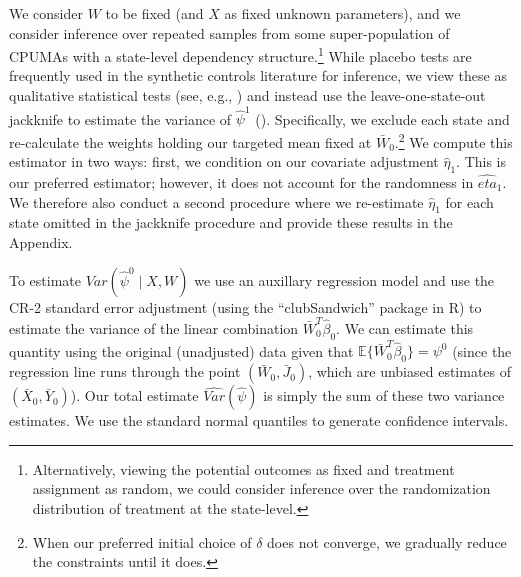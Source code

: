 We consider $W$ to be fixed (and $X$ as fixed unknown parameters), and we consider inference over repeated samples from some super-population of CPUMAs with a state-level dependency structure.\footnote{Alternatively, viewing the potential outcomes as fixed and treatment assignment as random, we could consider inference over the randomization distribution of treatment at the state-level.} While placebo tests are frequently used in the synthetic controls literature for inference, we view these as qualitative statistical tests (see, e.g., \cite{arkhangelsky2019synthetic}) and instead use the leave-one-state-out jackknife to estimate the variance of $\hat{\psi}^1$ (\cite{cameron2015practitioner}). Specifically, we exclude each state and re-calculate the weights holding our targeted mean fixed at $\bar{W}_0$.\footnote{When our preferred initial choice of $\delta$ does not converge, we gradually reduce the constraints until it does.} We compute this estimator in two ways: first, we condition on our covariate adjustment $\hat{\eta}_1$. This is our preferred estimator; however, it does not account for the randomness in $\hat{eta}_1$. We therefore also conduct a second procedure where we re-estimate $\hat{\eta}_1$ for each state omitted in the jackknife procedure and provide these results in the Appendix.

To estimate $Var(\hat{\psi}^0 \mid X, W)$ we use an auxillary regression model and use the CR-2 standard error adjustment (using the ``clubSandwich'' package in R) to estimate the variance of the linear combination $\bar{W}_0^T\hat{\beta}_0$. We can estimate this quantity using the original (unadjusted) data given that $\mathbb{E}\{\bar{W}_0^T\hat{\beta}_0\} = \psi^0$ (since the regression line runs through the point $(\bar{W}_0, \bar{J}_0)$, which are unbiased estimates of $(\bar{X}_0, \bar{Y}_0)$). Our total estimate $\hat{Var}(\hat{\psi})$ is simply the sum of these two variance estimates. We use the standard normal quantiles to generate confidence intervals. 
